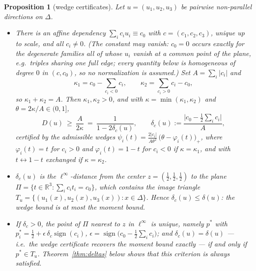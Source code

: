 \documentclass{aims}
\numberwithin{equation}{section}
\theoremstyle{plain}
\newtheorem{proposition}[theorem]{Proposition}
\theoremstyle{definition}
\theoremstyle{remark}
\newcommand{\R}{\mathbb{R}}
\begin{document}
\begin{proposition}[wedge certificates]\label{prop:wedge}
Let $u=(u_1,u_2,u_3)$ be pairwise non-parallel directions on $\Delta$.
\begin{itemize}
\item[(i)] There is an affine dependency $\sum_ic_iu_i\equiv c_0$ with
$c=(c_1,c_2,c_3)$, unique up to scale, and all $c_i\ne0$. (The constant may
vanish: $c_0=0$ occurs exactly for the degenerate families all of whose
$u_i$ vanish at a common point of the plane, e.g.\ triples sharing one full
edge; every quantity below is homogeneous of degree $0$ in $(c,c_0)$, so no
normalization is assumed.) Set
$A=\sum_i|c_i|$ and
\[
\kappa_1=c_0-\sum_{c_i<0}c_i,\qquad \kappa_2=\sum_{c_i>0}c_i-c_0 ,
\]
so $\kappa_1+\kappa_2=A$. Then $\kappa_1,\kappa_2>0$, and with
$\kappa=\min(\kappa_1,\kappa_2)$ and $\theta=2\kappa/A\in(0,1]$,
\[
D(u)\ \ge\ \frac{A}{2\kappa}\ =\ \frac1{1-2\delta_c(u)},\qquad
\delta_c(u):=\frac{\bigl|c_0-\tfrac12\sum_ic_i\bigr|}{A},
\]
certified by the admissible wedges
$\psi_i(t)=\frac{2|c_i|}{A\theta^2}\,\bigl(\theta-\varphi_i(t)\bigr)_+$, where
$\varphi_i(t)=t$ for $c_i>0$ and $\varphi_i(t)=1-t$ for $c_i<0$ if
$\kappa=\kappa_1$, and with $t\leftrightarrow1-t$ exchanged if
$\kappa=\kappa_2$.
\item[(ii)] $\delta_c(u)$ is the $\ell^\infty$-distance from the center
$z=(\tfrac12,\tfrac12,\tfrac12)$ to the plane
$\Pi=\{t\in\R^3:\sum_ic_it_i=c_0\}$, which contains the image triangle
$T_u=\{(u_1(x),u_2(x),u_3(x)):x\in\Delta\}$. Hence
$\delta_c(u)\le\delta(u)$: the wedge bound is at most the moment bound.
\item[(iii)] If $\delta_c>0$, the point of $\Pi$ nearest to $z$ in
$\ell^\infty$ is unique, namely $p^\ast$ with
$p^\ast_i=\tfrac12+\epsilon\,\delta_c\operatorname{sign}(c_i)$,
$\epsilon=\operatorname{sign}\bigl(c_0-\tfrac12\sum_ic_i\bigr)$; and
$\delta_c(u)=\delta(u)$ --- i.e.\ the wedge certificate recovers the moment
bound exactly --- if and only if $p^\ast\in T_u$. Theorem~\ref{thm:deltas}
below shows that this criterion is \emph{always} satisfied.
\end{itemize}
\end{proposition}
\end{document}

